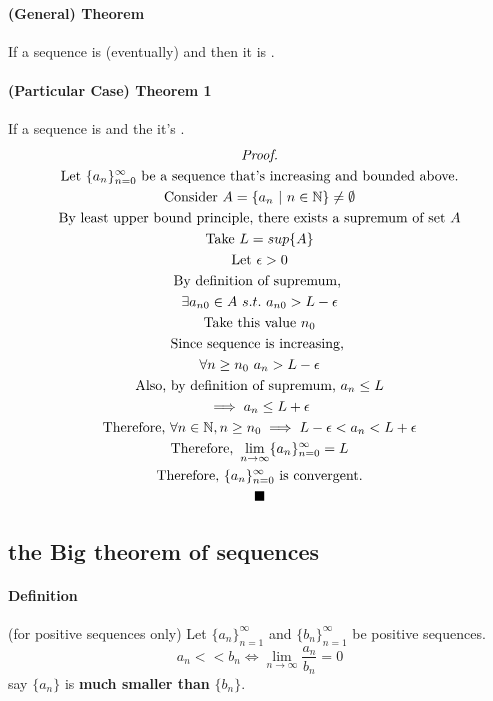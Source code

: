 \documentclass{article}
\newcommand{\sequence}[3]{\{#1_{n}\}_{n={#2}}^{#3}}
\newcommand{\N}[0]{\mathbb{N}}
\begin{document}
	\paragraph{(General) Theorem} If a sequence is (eventually)  and  then it is .
	
	\paragraph{(Particular Case) Theorem 1} If a sequence is  and  the it's .
\begin{multline*}
	\emph{Proof.} \\
	\text{Let } \sequence{a}{0}{\infty} \text{ be a sequence that's increasing and bounded above.} \\
	\text{Consider } A = \{a_n\ \vert\ n \in \N\} \neq \emptyset \\
	\text{By least upper bound principle, there exists a supremum of set $A$} \\
	\text{Take } L = sup\{A\} \\
	\text{Let } \epsilon > 0 \\
	\text{By definition of supremum, } \\
	\exists a_{n0} \in A\ s.t.\ a_{n0} > L - \epsilon \\ 
	\text{Take this value }n_0 \\
	\text{Since sequence is increasing, } \\
	\forall n \geq n_0\ a_n > L - \epsilon \\
	\text{Also, by definition of supremum, } a_n \leq L \\
	\implies a_n \leq L + \epsilon \\
	\text{Therefore, } \forall n \in \N, n \geq n_0 \implies L - \epsilon < a_n < L + \epsilon \\
	\text{Therefore, } \lim_{n \to \infty}\sequence{a}{0}{\infty} = L \\
	\text{Therefore, } \sequence{a}{0}{\infty} \text{ is convergent.} \\
	\blacksquare
\end{multline*}

\subsection{the Big theorem of sequences}
\paragraph{Definition} (for positive sequences only) Let $\sequence{a}{1}{\infty}$ and $\sequence{b}{1}{\infty}$ be positive sequences.
\[
	a_n << b_n \iff \lim_{n \to \infty}\frac{a_n}{b_n} = 0
\]
	say $\{a_n\}$ is \textbf{much smaller than} $\{b_n\}$.
\end{document}

